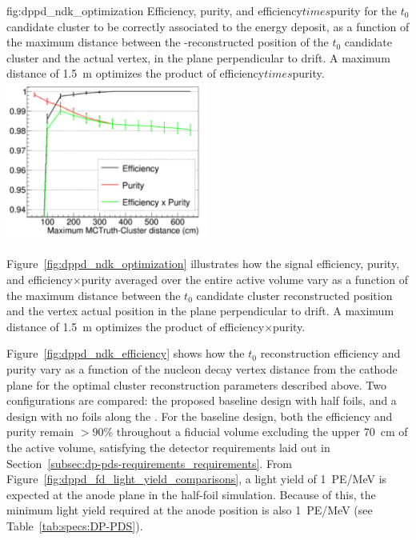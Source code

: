 \begin{dunefigure}{fig:dppd_ndk_optimization}
{Efficiency, purity, and efficiency$times$purity for the $t_0$ candidate cluster to be correctly associated to the  energy deposit, as a function of the maximum \twod distance between the -reconstructed position of the $t_0$ candidate cluster and the actual  vertex, in the plane perpendicular to drift. A maximum distance of \SI{1.5}{\m} optimizes the product of efficiency$times$purity.}
\includegraphics[width=0.5\textwidth]{graphics/dppd_ndk_optimization.pdf}
\end{dunefigure}

Figure~\ref{fig:dppd_ndk_optimization} illustrates how the  signal efficiency, purity, and efficiency$\times$purity averaged over the entire  active volume vary as a function of the maximum \twod distance between the $t_0$ candidate cluster reconstructed position and the  vertex actual position in the plane perpendicular to drift. A maximum distance of \SI{1.5}{\m} optimizes the product of efficiency$\times$purity. 

Figure~\ref{fig:dppd_ndk_efficiency} shows how the  $t_0$ reconstruction efficiency and purity vary as a function of the nucleon decay vertex distance from the cathode plane for the optimal cluster reconstruction parameters described above. Two configurations are compared: the proposed baseline design with half foils, and a design with no foils along the . For the baseline design, both the efficiency and purity remain $>90\%$ throughout a  fiducial volume excluding the upper \SI{70}{cm} of the  active volume, satisfying the detector requirements laid out in Section~\ref{subsec:dp-pds-requirements_requirements}. From Figure~\ref{fig:dppd_fd_light_yield_comparisons}, a light yield of \SI{1}{PE/\MeV} is expected at the anode plane in the half-foil simulation. Because of this, the  minimum light yield required at the anode position is also \SI{1}{PE/\MeV} (see Table~\ref{tab:specs:DP-PDS}). 

